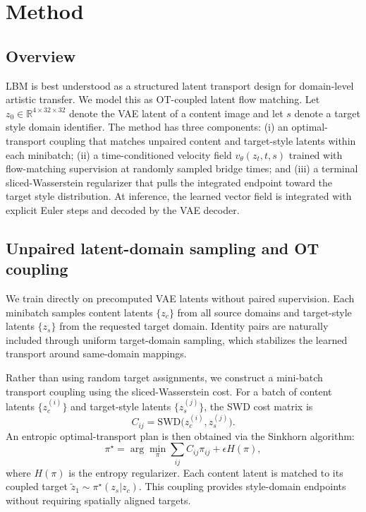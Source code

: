 ﻿\documentclass[letterpaper]{article}
\begin{document}
\section{Method}
\subsection{Overview}
LBM is best understood as a structured latent transport design for domain-level artistic transfer. We model this as OT-coupled latent flow matching. Let $z_0 \in \mathbb{R}^{4 \times 32 \times 32}$ denote the VAE latent of a content image and let $s$ denote a target style domain identifier. The method has three components: (i) an optimal-transport coupling that matches unpaired content and target-style latents within each minibatch; (ii) a time-conditioned velocity field $v_\theta(z_t,t,s)$ trained with flow-matching supervision at randomly sampled bridge times; and (iii) a terminal sliced-Wasserstein regularizer that pulls the integrated endpoint toward the target style distribution. At inference, the learned vector field is integrated with explicit Euler steps and decoded by the VAE decoder.

\subsection{Unpaired latent-domain sampling and OT coupling}
We train directly on precomputed VAE latents without paired supervision. Each minibatch samples content latents $\{z_c\}$ from all source domains and target-style latents $\{z_s\}$ from the requested target domain. Identity pairs are naturally included through uniform target-domain sampling, which stabilizes the learned transport around same-domain mappings.

Rather than using random target assignments, we construct a mini-batch transport coupling using the sliced-Wasserstein cost. For a batch of content latents $\{z_c^{(i)}\}$ and target-style latents $\{z_s^{(j)}\}$, the SWD cost matrix is
\begin{equation}
    C_{ij} = \mathrm{SWD}\bigl(z_c^{(i)}, z_s^{(j)}\bigr) .
\end{equation}
An entropic optimal-transport plan is then obtained via the Sinkhorn algorithm:
\begin{equation}
    \pi^\star = \arg\min_\pi \sum_{ij} C_{ij}\pi_{ij} + \epsilon H(\pi),
\end{equation}
where $H(\pi)$ is the entropy regularizer. Each content latent is matched to its coupled target $\tilde{z}_1 \sim \pi^\star(z_s|z_c)$. This coupling provides style-domain endpoints without requiring spatially aligned targets.
\end{document}
